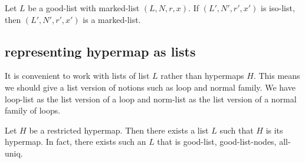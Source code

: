 \begin{lemma}
Let $L$ be a good-list with marked-list $(L,N,r,x)$.  If $(L',N',r',x')$ is iso-list, then $(L',N',r',x')$ is a marked-list.
\end{lemma}



\subsection{representing hypermap as lists}

It is convenient to work with lists of list $L$ rather than hypermaps $H$.  This means
we should give a list version of notions such as loop and normal family.
We have loop-list as the list version of a loop and norm-list as the list
version of  a normal family of loops.  




\begin{lemma}
Let $H$ be a restricted hypermap.  Then there exists a list $L$ such that $H$ is its hypermap.
In fact, there exists such an $L$ that is good-list, good-list-nodes, all-uniq.
\end{lemma}

